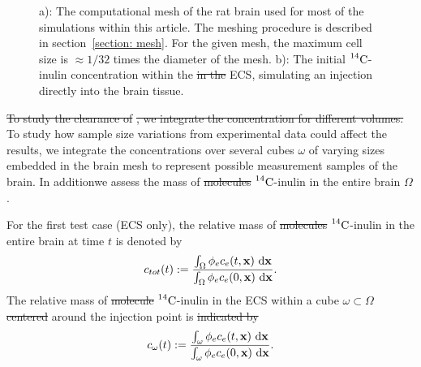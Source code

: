 \documentclass[a4paper,11pt]{article} %
\newcommand{\1}{^{(1)}}
\newcommand{\2}{^{(2)}}
\newcommand*{\dd}{\mathop{\kern0pt\mathrm{d}}\!{}}
\newcommand {\x}   {\mathbf{x}}
\newcommand{\Cinulin}{$\prescript{14}{}{\text{C}}$-inulin }
\providecommand{\DIFaddtex}[1]{{\protect\color{blue}\uwave{#1}}} %
\providecommand{\DIFdeltex}[1]{{\protect\color{red}\sout{#1}}}                      %
\providecommand{\DIFaddbegin}{} %
\providecommand{\DIFaddend}{} %
\providecommand{\DIFdelbegin}{} %
\providecommand{\DIFdelend}{} %
\providecommand{\DIFdelFL}[1]{\DIFdel{#1}} %
\providecommand{\DIFaddbeginFL}{} %
\providecommand{\DIFaddendFL}{} %
\providecommand{\DIFdelbeginFL}{} %
\providecommand{\DIFdelendFL}{} %
\providecommand{\DIFadd}[1]{\texorpdfstring{\DIFaddtex{#1}}{#1}} %
\providecommand{\DIFdel}[1]{\texorpdfstring{\DIFdeltex{#1}}{}} %
\newcommand{\DIFscaledelfig}{0.5}
\newlength{\DIFdelgraphicswidth} %
\newlength{\DIFdelgraphicsheight} %
\newcommand{\DIFaddincludegraphics}[2][]{{\color{blue}\fbox{\DIFOincludegraphics[#1]{#2}}}} %
\newcommand{\DIFdelincludegraphics}[2][]{%
\sbox{\DIFdelgraphicsbox}{\DIFOincludegraphics[#1]{#2}}%
\settoboxwidth{\DIFdelgraphicswidth}{\DIFdelgraphicsbox} %
\settoboxtotalheight{\DIFdelgraphicsheight}{\DIFdelgraphicsbox} %
\scalebox{\DIFscaledelfig}{%
\parbox[b]{\DIFdelgraphicswidth}{\usebox{\DIFdelgraphicsbox}\\[-\baselineskip] \rule{\DIFdelgraphicswidth}{0em}}\llap{\resizebox{\DIFdelgraphicswidth}{\DIFdelgraphicsheight}{%
\setlength{\unitlength}{\DIFdelgraphicswidth}%
\begin{picture}(1,1)%
\thicklines\linethickness{2pt} %
{\color[rgb]{1,0,0}\put(0,0){\framebox(1,1){}}}%
{\color[rgb]{1,0,0}\put(0,0){\line( 1,1){1}}}%
{\color[rgb]{1,0,0}\put(0,1){\line(1,-1){1}}}%
\end{picture}%
}\hspace*{3pt}}} %
} %
\DeclareRobustCommand{\DIFaddbegin}{\DIFOaddbegin \let\includegraphics\DIFaddincludegraphics} %
\DeclareRobustCommand{\DIFaddend}{\DIFOaddend \let\includegraphics\DIFOincludegraphics} %
\DeclareRobustCommand{\DIFdelbegin}{\DIFOdelbegin \let\includegraphics\DIFdelincludegraphics} %
\DeclareRobustCommand{\DIFdelend}{\DIFOaddend \let\includegraphics\DIFOincludegraphics} %
\DeclareRobustCommand{\DIFaddbeginFL}{\DIFOaddbeginFL \let\includegraphics\DIFaddincludegraphics} %
\DeclareRobustCommand{\DIFaddendFL}{\DIFOaddendFL \let\includegraphics\DIFOincludegraphics} %
\DeclareRobustCommand{\DIFdelbeginFL}{\DIFOdelbeginFL \let\includegraphics\DIFdelincludegraphics} %
\DeclareRobustCommand{\DIFdelendFL}{\DIFOaddendFL \let\includegraphics\DIFOincludegraphics} %
\begin{document}
\begin{figure}[htb]
    \centering
    \DIFaddbeginFL 

    \DIFaddendFL \hfill
    \caption{a): The computational mesh of the rat brain used for most of the simulations within this article. The meshing procedure is described in section~\ref{section: mesh}. For the given mesh, the maximum cell size is $\approx 1/32$ times the diameter of the mesh. b): The initial \Cinulin concentration within the \DIFdelbeginFL \DIFdelFL{in the }\DIFdelendFL ECS, simulating an injection directly into the brain tissue.}
    \label{fig:mesh-illustration}
\end{figure}

\DIFdelbegin \DIFdel{To study the clearance of }%
\DIFdel{, we integrate the concentration for different volumes. }\DIFdelend %
To study how sample size variations from experimental data could affect the results, we integrate the concentrations over several cubes \DIFdelbegin \DIFdel{$\omega$ }\DIFdelend \DIFaddbegin \DIFadd{$\omega \subset \Omega$ }\DIFaddend of varying sizes embedded in the brain mesh to represent possible measurement samples of the brain. In addition\DIFaddbegin \DIFadd{, }\DIFaddend we assess the mass of \DIFdelbegin \DIFdel{molecules }\DIFdelend \DIFaddbegin \Cinulin \DIFaddend in the entire brain $\Omega$. 

For the first test case (ECS only), the relative mass of \DIFdelbegin \DIFdel{molecules }\DIFdelend \DIFaddbegin \Cinulin \DIFaddend in the entire brain at time $t$ is denoted by 
\[
c_{tot}(t) := \frac{\int_\Omega \phi_e c_e(t,\x) \, \dd \x }{ \int_\Omega \phi_e c_e(0,\x) \, \dd \x}.
\]
The relative mass of \DIFdelbegin \DIFdel{molecule }\DIFdelend \DIFaddbegin \Cinulin \DIFaddend in the ECS within a cube $\omega \subset \Omega$ \DIFdelbegin \DIFdel{centered }\DIFdelend \DIFaddbegin \DIFadd{centred }\DIFaddend around the injection point is \DIFdelbegin \DIFdel{indicated by 
}\DIFdelend \DIFaddbegin \DIFadd{defined as
}\DIFaddend \[
c_{\omega}(t) :=  \frac{\int_{\omega}  \phi_e c_e(t,\x) \, \dd \x }{\int_\omega  \phi_e c_e(0,\x) \, \dd \x}.  
\]
\end{document}
